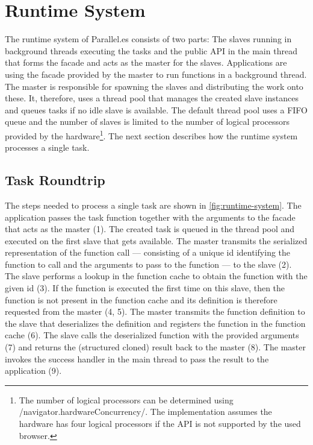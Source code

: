 \section{Runtime System}\label{sec:runtime-system}
The runtime system of Parallel.es consists of two parts: The slaves running in background threads executing the tasks and the public API in the main thread that forms the facade and acts as the master for the slaves. Applications are using the facade provided by the master to run functions in a background thread. The master is responsible for spawning the slaves and distributing the work onto these. It, therefore, uses a thread pool that manages the created slave instances and queues tasks if no idle slave is available. The default thread pool uses a FIFO queue and the number of slaves is limited to the number of logical processors provided by the hardware\footnote{The number of logical processors can be determined using \javascriptinline/navigator.hardwareConcurrency/. The implementation assumes the hardware has four logical processors if the API is not supported by the used browser.}. The next section describes how the runtime system processes a single task. 

\subsection{Task Roundtrip}
The steps needed to process a single task are shown in \cref{fig:runtime-system}. The application passes the task function together with the arguments to the facade that acts as the master (1). The created task is queued in the thread pool and executed on the first slave that gets available. The master transmits the serialized representation of the function call --- consisting of a unique id identifying the function to call and the arguments to pass to the function --- to the slave (2). The slave performs a lookup in the function cache to obtain the function with the given id (3). If the function is executed the first time on this slave, then the function is not present in the function cache and its definition is therefore requested from the master (4, 5). The master transmits the function definition to the slave that deserializes the definition and registers the function in the function cache (6). The slave calls the deserialized function with the provided arguments (7) and returns the (structured cloned) result back to the master (8). The master invokes the success handler in the main thread to pass the result to the application (9). 

